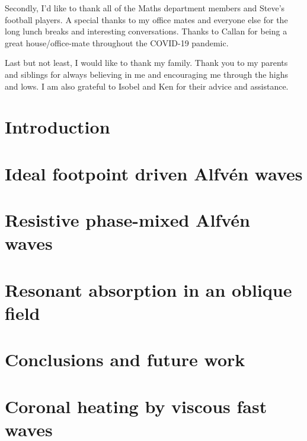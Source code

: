 \documentclass[12pt,fleqn]{report}
\numberwithin{equation}{section}
\begin{document}
Secondly, I'd like to thank all of the Maths department members and Steve's football players. A special thanks to my office mates and everyone else for the long lunch breaks and interesting conversations. Thanks to Callan for being a great house/office-mate throughout the COVID-19 pandemic.

Last but not least, I would like to thank my family. Thank you to my parents and siblings for always believing in me and encouraging me through the highs and lows. I am also grateful to Isobel and Ken for their advice and assistance.
 
\tableofcontents

\chapter{Introduction}
\label{chap:introduction}


\chapter{Ideal footpoint driven Alfv\'en waves}
\label{chap:ideal_footpoint_driven_alfven_waves}


\chapter{Resistive phase-mixed Alfv\'en waves}
\label{chap:resistive_phase_mixed_alfven_waves}

 
\chapter{Resonant absorption in an oblique field}
\label{chap:resonant_absorption_in_an_oblique_field}

 
\chapter{Conclusions and future work}
\label{chap:conclusions_and_future_work}


\appendix
\chapter{Coronal heating by viscous fast waves}
\label{adx:coronal_heating_by_viscous_fast_waves}




\end{document}
